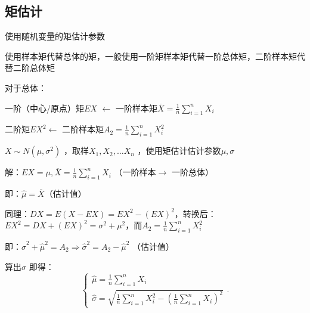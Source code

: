 \subsection{矩估计}%
\label{sub:矩估计}
\begin{defi}
    使用随机变量的矩估计参数

    使用样本矩代替总体的矩，一般使用一阶矩样本矩代替一阶总体矩，二阶样本矩代替二阶总体矩
\end{defi}
    对于总体：

    一阶（中心/原点）矩$EX$ $\leftarrow$ 一阶样本矩$\overline{X}=\frac{1}{n}\sum_{i=1}^{n} X_{i}$ 

    二阶矩$EX^2 \leftarrow$ 二阶样本矩$A_2=\frac{1}{n}\sum_{i=1}^{n} X_{i}^2 $
\begin{eg}
    $X\sim N\left( \mu,\sigma^2  \right)$ ，取样$X_1,X_2,\ldots X_{n}$ ，使用矩估计估计参数$\mu,\sigma$
\end{eg}
解：$EX=\mu, \overline{X}=\frac{1}{n}\sum_{i=1}^{n} X_{i}$ （一阶样本$\to $ 一阶总体）

即：$\hat{\mu}=\overline{X}$（估计值）

同理：$DX=E\left( X-EX \right)=EX^2 -\left( EX \right)^2 $，转换后：$EX^2 =DX+\left( EX \right)^2 =\sigma^2 +\mu^2 $，而$A_2 =\frac{1}{n}\sum_{i=1}^{n} X_{i}^2 $

即：$\hat{\sigma}^2 +\hat{\mu}^2 =A_2\Rightarrow \hat{\sigma}^2 =A_2-\hat{\mu}^2 $ （估计值）

算出$\hat{\sigma}$ 即得：\[
    \begin{cases}
        \hat{\mu}=\frac{1}{n}\sum_{i=1}^{n} X_{i}\\
        \hat{\sigma}=\sqrt{\frac{1}{n}\sum_{i=1}^{n} X_{i}^2 -\left( \frac{1}{n}\sum_{i=1}^{n} X_{i} \right)^2 }
    \end{cases}
.\]
